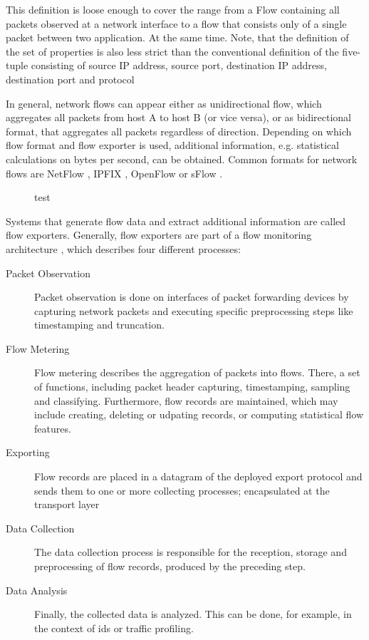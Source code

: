 This definition is loose enough to cover the range from a Flow containing all packets observed at a network interface to a flow that consists only of a single packet between two application. At the same time. Note, that the definition of the set of properties is also less strict than the conventional definition of the five-tuple consisting of source IP address, source port, destination IP address, destination port and protocol \cite{rfc5101}

In general, network flows can appear either as unidirectional flow, which aggregates all packets from host A to host B (or vice versa), or as bidirectional format, that aggregates all packets regardless of direction. Depending on which flow format and flow exporter is used, additional information, e.g. statistical calculations on bytes per second, can be obtained. Common formats for network flows are NetFlow \cite{rfc3954}, IPFIX \cite{rfc5101}, OpenFlow \cite{mck_2008} or sFlow \cite{pha_2004}.


\begin{figure}[t]
    \centering
    
    \caption{test}
    \label{fig:flow-export}
\end{figure}


Systems that generate flow data and extract additional information are called flow exporters. Generally, flow exporters are part of a flow monitoring architecture \cite{hof_2014}, which describes four different processes:

\begin{description}
    \item[Packet Observation] Packet observation is done on interfaces of packet forwarding devices by capturing network packets and executing specific preprocessing steps like timestamping and truncation.
    \item[Flow Metering] Flow metering describes the aggregation of packets into flows. There, a set of functions, including packet header capturing, timestamping, sampling and classifying. Furthermore, flow records are maintained, which may include creating, deleting or udpating records, or computing statistical flow features. 
    \item[Exporting] Flow records are placed in a datagram of the deployed export protocol and sends them to one or more collecting processes; encapsulated at the transport layer
    \item[Data Collection] The data collection process is responsible for the reception, storage and preprocessing of flow records, produced by the preceding step.
    \item[Data Analysis] Finally, the collected data is analyzed. This can be done, for example, in the context of \acrshort{ids} or traffic profiling.
\end{description}

